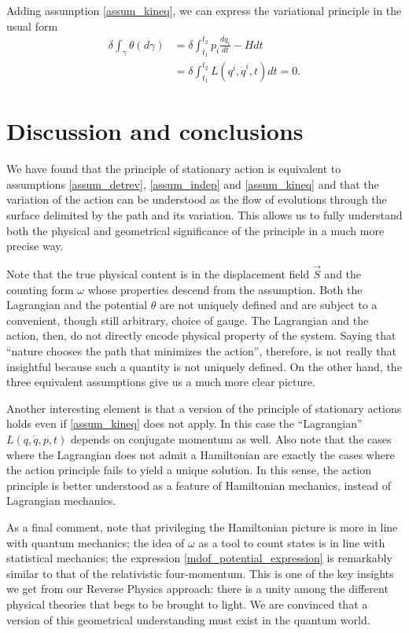\documentclass[10pt,twocolumn, nofootinbib]{revtex4-2}
\begin{document}
Adding assumption \ref{assum_kineq}, we can express the variational principle in the usual form
\begin{equation}\label{mdof_Lagrangian}
	\begin{aligned}
		\delta \int_{\gamma} \theta(d\gamma) &= \delta \int^{t_2}_{t_1} p_i \frac{dq_i}{dt} - H dt \\
		 &= \delta \int^{t_2}_{t_1}L(q^i, \dot{q}^i, t) dt = 0.
	\end{aligned}
\end{equation}

\section{Discussion and conclusions}

We have found that the principle of stationary action is equivalent to assumptions \ref{assum_detrev}, \ref{assum_indep} and \ref{assum_kineq} and that the variation of the action can be understood as the flow of evolutions through the surface delimited by the path and its variation. This allows us to fully understand both the physical and geometrical significance of the principle in a much more precise way.

Note that the true physical content is in the displacement field $\vec{S}$ and the counting form $\omega$ whose properties descend from the assumption. Both the Lagrangian and the potential $\theta$ are not uniquely defined and are subject to a convenient, though still arbitrary, choice of gauge. The Lagrangian and the action, then, do not directly encode physical property of the system. Saying that ``nature chooses the path that minimizes the action'', therefore, is not really that insightful because such a quantity is not uniquely defined. On the other hand, the three equivalent assumptions give us a much more clear picture.

Another interesting element is that a version of the principle of stationary actions holds even if \ref{assum_kineq} does not apply. In this case the ``Lagrangian'' $L(q,\dot{q},p,t)$ depends on conjugate momentum as well. Also note that the cases where the Lagrangian does not admit a Hamiltonian are exactly the cases where the action principle fails to yield a unique solution. In this sense, the action principle is better understood as a feature of Hamiltonian mechanics, instead of Lagrangian mechanics.

As a final comment, note that privileging the Hamiltonian picture is more in line with quantum mechanics; the idea of $\omega$ as a tool to count states is in line with statistical mechanics; the expression \ref{mdof_potential_expression} is remarkably similar to that of the relativistic four-momentum. This is one of the key insights we get from our Reverse Physics approach: there is a unity among the different physical theories that begs to be brought to light. We are convinced that a version of this geometrical understanding must exist in the quantum world.
\end{document}
